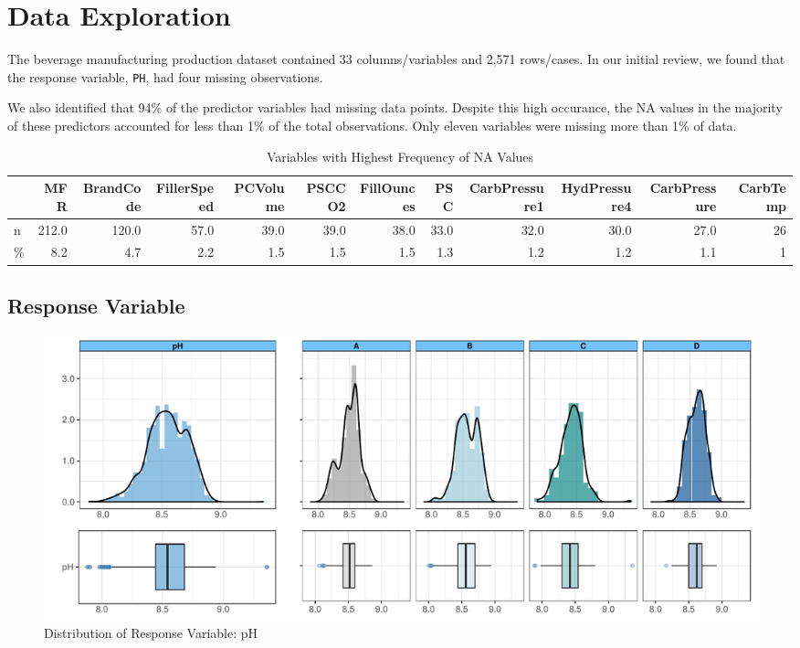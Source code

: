\documentclass[]{report}
\begin{document}
\hypertarget{data-exploration}{%
\chapter{Data Exploration}\label{data-exploration}}

The beverage manufacturing production dataset contained 33
columns/variables and 2,571 rows/cases. In our initial review, we found
that the response variable, \texttt{PH}, had four missing observations.

We also identified that 94\% of the predictor variables had missing data
points. Despite this high occurance, the NA values in the majority of
these predictors accounted for less than 1\% of the total observations.
Only eleven variables were missing more than 1\% of data.

\begin{table}[H]

\caption{\label{tab:unnamed-chunk-1}Variables with Highest Frequency of NA Values}
\centering
\fontsize{8}{10}\selectfont
\begin{tabular}{lrrrrrrrrrrr}
\toprule
\textbf{ } & \textbf{MFR} & \textbf{BrandCode} & \textbf{FillerSpeed} & \textbf{PCVolume} & \textbf{PSCCO2} & \textbf{FillOunces} & \textbf{PSC} & \textbf{CarbPressure1} & \textbf{HydPressure4} & \textbf{CarbPressure} & \textbf{CarbTemp}\\
\midrule
\rowcolor{gray!6}  n & 212.0 & 120.0 & 57.0 & 39.0 & 39.0 & 38.0 & 33.0 & 32.0 & 30.0 & 27.0 & 26\\
\% & 8.2 & 4.7 & 2.2 & 1.5 & 1.5 & 1.5 & 1.3 & 1.2 & 1.2 & 1.1 & 1\\
\bottomrule
\end{tabular}
\end{table}

\hypertarget{response-variable}{%
\section{Response Variable}\label{response-variable}}

\begin{figure}[H]

\hfill{}\includegraphics[width=1\textwidth]{Proj2-JM_files/figure-latex/unnamed-chunk-2-1} 

\caption{Distribution of Response Variable: pH}\label{fig:unnamed-chunk-2}
\end{figure}
\end{document}
